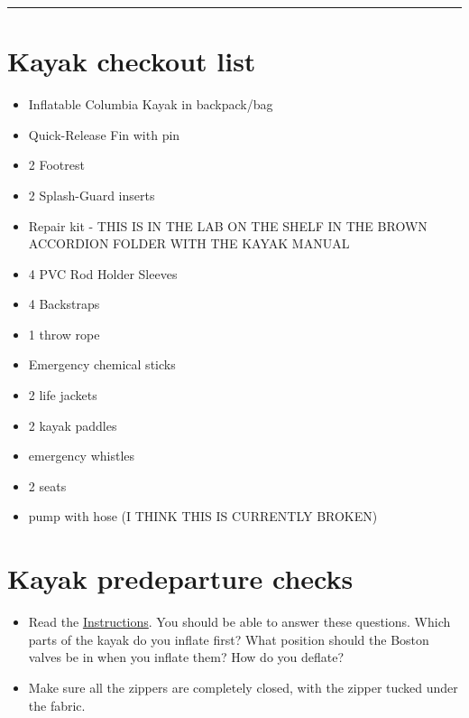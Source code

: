 \documentclass[
  letterpaper,
  DIV=11,
  numbers=noendperiod]{scrreprt}
\begin{document}
\begin{center}\rule{0.5\linewidth}{0.5pt}\end{center}

\hypertarget{kayak-checkout-list}{%
\section*{\texorpdfstring{\textbf{Kayak checkout
list}}{Kayak checkout list}}\label{kayak-checkout-list}}


\begin{itemize}
\item
  Inflatable Columbia Kayak in backpack/bag
\item
  Quick-Release Fin with pin
\item
  2 Footrest
\item
  2 Splash-Guard inserts
\item
  Repair kit - THIS IS IN THE LAB ON THE SHELF IN THE BROWN ACCORDION
  FOLDER WITH THE KAYAK MANUAL
\item
  4 PVC Rod Holder Sleeves
\item
  4 Backstraps
\item
  1 throw rope
\item
  Emergency chemical sticks
\item
  2 life jackets
\item
  2 kayak paddles
\item
  emergency whistles
\item
  2 seats
\item
  pump with hose (I THINK THIS IS CURRENTLY BROKEN)
\end{itemize}

\hypertarget{kayak-predeparture-checks}{%
\section*{Kayak predeparture checks}\label{kayak-predeparture-checks}}


\begin{itemize}
\item
  Read the
  \href{https://drk-lo.github.io/lotterhoslabprotocols/img/kayak_Aquaglide_Manual_2017.pdf}{Instructions}.
  You should be able to answer these questions. Which parts of the kayak
  do you inflate first? What position should the Boston valves be in
  when you inflate them? How do you deflate?
\item
  Make sure all the zippers are completely closed, with the zipper
  tucked under the fabric.
\end{itemize}
\end{document}
